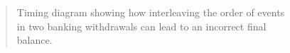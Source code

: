 \begin{figure}[tp]
\label{Figure 3.29}
\centering
\begin{comment}
\heading{Figure 3.29:} Timing diagram showing how interleaving the order of events
in two banking withdrawals can lead to an incorrect final balance.

\begin{example}
 |           Peter              Bank              Paul
 |                              ____
 |                             /    \
 |             .--------------| \$100 |-------------.
 |             |               \____/              |
 |             V                                   V
 |  .----------------------.            .----------------------.
 |  | Access balance: \$100 |            | Access balance: \$100 |
 |  `----------+-----------'            `----------+-----------'
 |             V                                   V
 |  .----------------------.            .----------------------.
 |  | new value: 100-10=90 |            | new value: 100-25=75 |
 |  `----------+-----------'            `----------+-----------'
 |             V                                   |
 |  .----------------------.                       |
 |  | set! balance to \$90  |                       |
 |  `----------+-----------'    ____               |
 |             |               /    \              |
 |             `------------->| \$ 90 |             V
 |                             \____/   .----------------------.
 |                                      | new value: 100-25=75 |
 |                              ____    `----------+-----------'
 |                             /    \              |
 |                            | \$ 90 |<------------'
 V                             \____/
time
\end{example}
\end{comment}

\begin{quote}
 Timing diagram showing how interleaving the order of events in two banking withdrawals can lead to an incorrect final balance.
\end{quote}
\end{figure}

